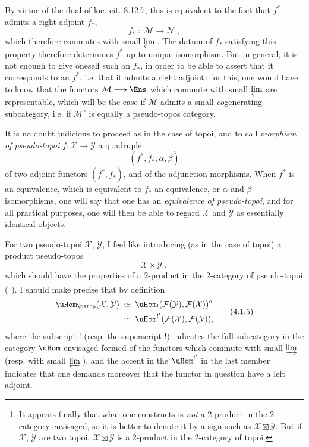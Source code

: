 By virtue of the dual of loc. cit. 8.12.7, this is equivalent to the fact that $f^*$ admits a right adjoint $f_*$,
\[
f_* \;:\; \mathcal{M} \longrightarrow \mathcal{N}\;,
\tag*{(4.1.2)}
\]
which therefore commutes with small $\varprojlim$\,. The datum of $f_*$ satisfying this property therefore determines $f^*$ up to unique isomorphism. But in general, it is not enough to give oneself such an $f_*$, in order to be able to assert that it corresponds to an $f^*$, i.e. that it admits a right adjoint\,; for this, one would have to know that the functors $\mathcal{M}\longrightarrow\Ens$ which commute with small $\varprojlim$ are representable, which will be the case if $\mathcal{M}$ admits a small \textit{co}generating subcategory, i.e. if $\mathcal{M}^\circ$ is equally a pseudo-topos category. %

\newpage


It is no doubt judicious to proceed as in the case of topoi, and to call \textit{morphism of pseudo-topoi} $f:\mathcal{X}\longrightarrow\mathcal{Y}$ a quadruple
\[
(f^*,f_*,\alpha,\beta)
\tag*{(4.1.3)}
\]
of two adjoint functors $(f^*,f_*)$, and of the adjunction morphisms. When $f^*$ is an equivalence, which is equivalent to $f_*$ an equivalence, or $\alpha$ and $\beta$ isomorphisms, one will say that one has an \textit{equivalence of pseudo-topoi}, and for all practical purposes, one will then be able to regard $\mathcal{X}$ and $\mathcal{Y}$ as essentially identical objects.

For two pseudo-topoi $\mathcal{X}$, $\mathcal{Y}$, I feel like introducing (as in the case of topoi) a product pseudo-topos
\[
\mathcal{X}\times\mathcal{Y}\;,
\tag*{(4.1.4)}
\]
which should have the properties of a 2-product in the 2-category of pseudo-topoi (\footnote{It appears finally that what one constructs is \textit{not} a 2-product in the 2-category envisaged, so it is better to denote it by a sign such as $\mathcal{X}\boxtimes\mathcal{Y}$. But if $\mathcal{X}$, $\mathcal{Y}$ are two topoi, $\mathcal{X}\boxtimes\mathcal{Y}$ is a 2-product in the 2-category of topoi.}). I should make precise that by definition
\[
\begin{aligned}
\uHom_{\pstop}(\mathcal{X},\mathcal{Y}) \;&\simeq\; \uHom_!(\mathcal{F}(\mathcal{Y}),\mathcal{F}(\mathcal{X}))^\circ\\
&\simeq\; \uHom^{!'}(\mathcal{F}(\mathcal{X}),\mathcal{F}(\mathcal{Y})),
\end{aligned}
\tag*{(4.1.5)}
\]
where the subscript ! (resp. the superscript !) indicates the full subcategory in the category $\uHom$ envisaged formed of the functors which commute with small $\varinjlim$ (resp. with small
$\varprojlim$\,), and the accent in the $\uHom^{!'}$ in the last member indicates that one demands moreover that the functor in question have a left adjoint.

